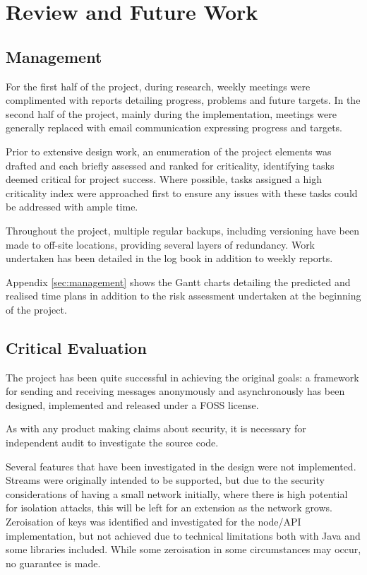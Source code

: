 \section{Review and Future Work}

	\subsection{Management}
		For the first half of the project, during research, weekly meetings were complimented with reports detailing progress, problems and future targets. In the second half of the project, mainly during the implementation, meetings were generally replaced with email communication expressing progress and targets.
		
		Prior to extensive design work, an enumeration of the project elements was drafted and each briefly assessed and ranked for criticality, identifying tasks deemed critical for project success. Where possible, tasks assigned a high criticality index were approached first to ensure any issues with these tasks could be addressed with ample time.
		
		Throughout the project, multiple regular backups, including versioning have been made to off-site locations, providing several layers of redundancy. Work undertaken has been detailed in the log book in addition to weekly reports.

		Appendix \ref{sec:management} shows the Gantt charts detailing the predicted and realised time plans in addition to the risk assessment undertaken at the beginning of the project.
	\subsection{Critical Evaluation}
		The project has been quite successful in achieving the original goals: a framework for sending and receiving messages anonymously and asynchronously has been designed, implemented and released under a FOSS license. 
		
		As with any product making claims about security, it is necessary for independent audit to investigate the source code. 
		
		Several features that have been investigated in the design were not implemented. Streams were originally intended to be supported, but due to the security considerations of having a small network initially, where there is high potential for isolation attacks, this will be left for an extension as the network grows. Zeroisation of keys was identified and investigated for the node/API implementation, but not achieved due to technical limitations both with Java and some libraries included. While some zeroisation in some circumstances may occur, no guarantee is made.
		
